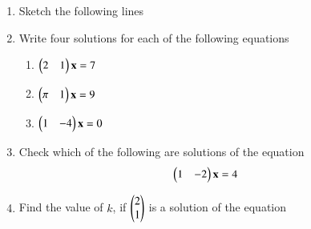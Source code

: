 \renewcommand{\theequation}{\theenumi}
\begin{enumerate}[label=\arabic*.,ref=\thesubsection.\theenumi]
%
\item Sketch the following lines
%
\begin{enumerate}[itemsep=2pt]
\end{enumerate}
%
%
\item Write four solutions for each of the following equations
\begin{enumerate}
\item $\begin{pmatrix}2 & 1\end{pmatrix}\mathbf{x} = 7$
\item $\begin{pmatrix} \pi & 1\end{pmatrix}\mathbf{x}  = 9 $
\item $\begin{pmatrix} 1 & -4\end{pmatrix}\mathbf{x}  = 0$
\end{enumerate}
%
\item Check which of the following are solutions of the equation 
%
\begin{align}
\begin{pmatrix}1 & -2\end{pmatrix}\mathbf{x} &= 4
\end{align}
%
%
\begin{enumerate}[itemsep=2pt]
\end{enumerate}
%
\item Find the value of $k$, if $\begin{pmatrix}2\\1\end{pmatrix}$ is a solution of the equation 

\end{enumerate}
